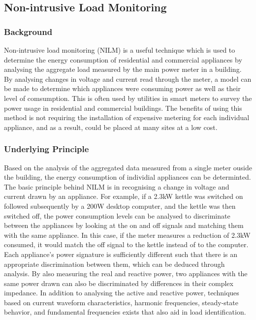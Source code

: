 \documentclass[12pt,twocolumn]{article}
\begin{document}
		\subsection{Non-intrusive Load Monitoring}

			\subsubsection*{Background}
			 \quad Non-intrusive load monitoring (NILM) is a useful technique which is used to determine the energy consumption of residential and commercial appliances by analysing the aggregate load measured by the main power meter in a building. By analysing changes in voltage and current read through the meter, a model can be made to determine which appliances were consuming power as well as their level of comsumption. This is often used by utilities in smart meters to survey the power usage in residential and commercial buildings. The benefits of using this method is not requiring the installation of expensive metering for each individual appliance, and as a result, could be placed at many sites at a low cost. 

			\subsubsection*{Underlying Principle}
			\quad Based on the analysis of the aggregated data measured from a single meter ouside the building, the energy consumption of individial appliances can be determinted. The basic principle behind NILM is in recognising a change in voltage and current drawn by an appliance. For example, if a 2.3kW kettle was switched on followed subsequently by a 200W desktop computer, and the kettle was then switched off, the power consumption levels can be analysed to discriminate between the appliances by looking at the on and off signals and matching them with the same appliance. In this case, if the meter measures a reduction of 2.3kW consumed, it would match the off signal to the kettle instead of to the computer. Each appliance's power signature is sufficiently different such that there is an appropriate discrimination between them, which can be deduced through analysis. By also measuring the real and reactive power, two appliances with the same power drawn can also be discriminated by differences in their complex impedance. In addition to analysing the active and reactive power, techniques based on current waveform characteristics, harmonic frequencies, steady-state behavior, and fundamental frequencies exists that also aid in load identification. 
\end{document}
